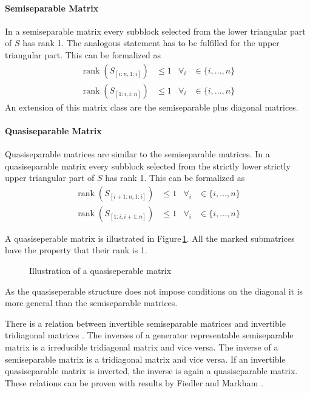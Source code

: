 \documentclass[numbers=noenddot,doctype=mastersthesis,BCOR=15mm,biblatex]{ldvbook}%
\DeclareMathOperator{\rank}{rank}
\begin{document}
\paragraph{Semiseparable Matrix}
In a semiseparable matrix every subblock selected from the lower triangular part of $S$ has rank 1. The analogous statement has to be fulfilled for the upper triangular part.
This can be formalized as 
\begin{align}
	\rank(S_{[i:n,1:i]}) &\leq 1 & \forall_i &\in\{i,\dots,n\}\\
	\rank(S_{[1:i,i:n]}) &\leq 1 & \forall_i &\in\{i,\dots,n\}
\end{align}
An extension of this matrix class are the semiseparable plus diagonal matrices.

\paragraph{Quasiseparable Matrix}
Quasiseparable matrices are similar to the semiseparable matrices. In a quasiseparable matrix every subblock selected from the strictly lower strictly upper triangular part of $S$ has rank 1. 
This can be formalized as 
\begin{align}
\rank(S_{[i+1:n,1:i]}) &\leq 1 & \forall_i &\in\{i,\dots,n\}\\
\rank(S_{[1:i,i+1:n]}) &\leq 1 & \forall_i &\in\{i,\dots,n\}
\end{align}

A quasiseperable matrix is illustrated in Figure\,\ref{fig:quasiseperable}. All the marked submatrices have the property that their rank is 1.
\begin{figure}
	\centering
	
	\caption{Illustration of a quasiseperable matrix}
	\label{fig:quasiseperable}
\end{figure}
As the quasiseperable structure does not impose conditions on the diagonal it is more general than the semiseparable matrices.

There is a relation between invertible semiseparable matrices and invertible tridiagonal matrices \cite{vandebril_matrix_2007}.
The inverses of a generator representable semiseparable matrix is a irreducible tridiagonal matrix and vice versa. 
The inverse of a semiseparable matrix is a tridiagonal matrix and vice versa.
If an invertible quasiseparable matrix is inverted, the inverse is again a quasiseparable matrix.
These relations can be proven with results by Fiedler and Markham \cite{fiedler_completing_1986}.
\end{document}
